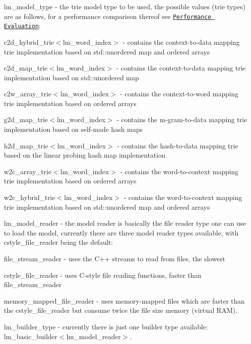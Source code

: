 \begin{DoxyItemize}
\item {\ttfamily lm\+\_\+model\+\_\+type} -\/ the trie model type to be used, the possible values (trie types) are as follows, for a performance comparison thereof see \href{#performance-evaluation}{\tt Performance Evaluation}\+:
\begin{DoxyItemize}
\item {\ttfamily c2d\+\_\+hybrid\+\_\+trie$<$lm\+\_\+word\+\_\+index$>$} -\/ contains the context-\/to-\/data mapping trie implementation based on {\ttfamily std\+::unordered} map and ordered arrays
\item {\ttfamily c2d\+\_\+map\+\_\+trie$<$lm\+\_\+word\+\_\+index$>$} -\/ contains the context-\/to-\/data mapping trie implementation based on {\ttfamily std\+::unordered map}
\item {\ttfamily c2w\+\_\+array\+\_\+trie$<$lm\+\_\+word\+\_\+index$>$} -\/ contains the context-\/to-\/word mapping trie implementation based on ordered arrays
\item {\ttfamily g2d\+\_\+map\+\_\+trie$<$lm\+\_\+word\+\_\+index$>$} -\/ contains the m-\/gram-\/to-\/data mapping trie implementation based on self-\/made hash maps
\item {\ttfamily h2d\+\_\+map\+\_\+trie$<$lm\+\_\+word\+\_\+index$>$} -\/ contains the hash-\/to-\/data mapping trie based on the linear probing hash map implementation
\item {\ttfamily w2c\+\_\+array\+\_\+trie$<$lm\+\_\+word\+\_\+index$>$} -\/ contains the word-\/to-\/context mapping trie implementation based on ordered arrays
\item {\ttfamily w2c\+\_\+hybrid\+\_\+trie$<$lm\+\_\+word\+\_\+index$>$} -\/ contains the word-\/to-\/context mapping trie implementation based on {\ttfamily std\+::unordered} map and ordered arrays
\end{DoxyItemize}
\item {\ttfamily lm\+\_\+model\+\_\+reader} -\/ the model reader is basically the file reader type one can use to load the model, currently there are three model reader types available, with {\ttfamily cstyle\+\_\+file\+\_\+reader} being the default\+:
\begin{DoxyItemize}
\item {\ttfamily file\+\_\+stream\+\_\+reader} -\/ uses the C++ streams to read from files, the slowest
\item {\ttfamily cstyle\+\_\+file\+\_\+reader} -\/ uses C-\/style file reading functions, faster than {\ttfamily file\+\_\+stream\+\_\+reader}
\item {\ttfamily memory\+\_\+mapped\+\_\+file\+\_\+reader} -\/ uses memory-\/mapped files which are faster than the {\ttfamily cstyle\+\_\+file\+\_\+reader} but consume twice the file size memory (virtual R\+A\+M).
\end{DoxyItemize}
\item {\ttfamily lm\+\_\+builder\+\_\+type} -\/ currently there is just one builder type available\+: {\ttfamily lm\+\_\+basic\+\_\+builder$<$lm\+\_\+model\+\_\+reader$>$}.
\end{DoxyItemize}

